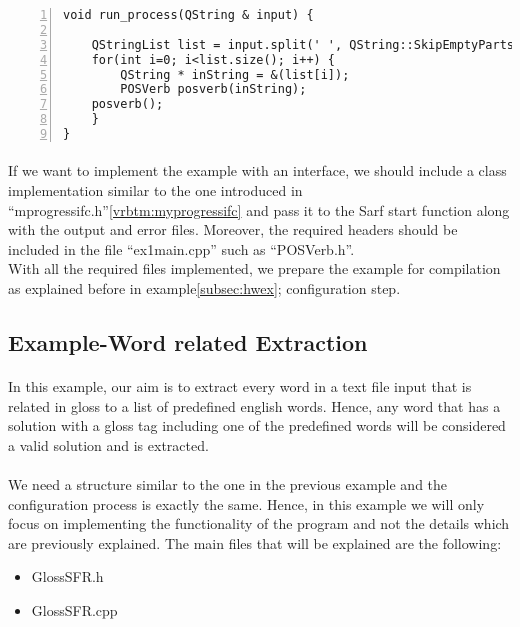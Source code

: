 \documentclass{article}
\begin{document}
\begin{Verbatim}[numbers=left]
void run_process(QString & input) {

    QStringList list = input.split(' ', QString::SkipEmptyParts);
    for(int i=0; i<list.size(); i++) {
        QString * inString = &(list[i]);
        POSVerb posverb(inString);
	posverb();
    }
}
\end{Verbatim}

\paragraph{}
If we want to implement the example with an interface, we should include a class implementation similar to the one introduced in ``mprogressifc.h''\ref{vrbtm:myprogressifc} and pass it to the Sarf start function along with the output and error files. Moreover, the required headers should be included in the file ``ex1main.cpp'' such as ``POSVerb.h''.\\
With all the required files implemented, we prepare the example for compilation as explained before in example\ref{subsec:hwex}; configuration step.

\subsection{Example-Word related Extraction}
\paragraph{}
In this example, our aim is to extract every word in a text file input that is related in gloss
to a list of predefined english words. Hence, any word that has a solution with a gloss tag including one of the predefined words will be considered a valid solution and is extracted.

\paragraph{}
We need a structure similar to the one in the previous example and the configuration process is exactly the same. Hence, in this example we will only focus on implementing the functionality of the program and not the details which are previously explained. The main files that will be explained are the following:

\begin{itemize}
\item GlossSFR.h
\item GlossSFR.cpp
\end{itemize}
\end{document}

